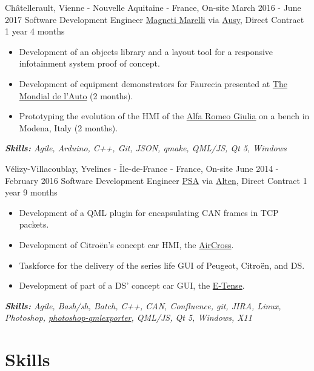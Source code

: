 \documentclass[11pt,a4paper,roman]{moderncv}
\begin{document}
\cventry
{Châtellerault, Vienne - Nouvelle Aquitaine - France, On-site}
{March 2016 - June 2017}
{Software Development Engineer}
{\href{https://www.marelli.com}{Magneti Marelli} via \href{https://www.ausy.com/en}{Ausy}, Direct Contract}
{1 year 4 months}
{}
{
\begin{itemize}
	\item Development of an objects library and a layout tool for a responsive infotainment system proof of concept.
	\item Development of equipment demonstrators for Faurecia presented at \href{https://mondial.paris/en/mondial-de-lauto}{The Mondial de l'Auto} (2 months).
	\item Prototyping the evolution of the HMI of the \href{https://www.alfaromeo.com/giulia}{Alfa Romeo Giulia} on a bench in Modena, Italy (2 months).
\end{itemize}
{\textcolor{color2}{\textit{\textbf{Skills:}
	Agile,
	Arduino,
	C++,
	Git,
	JSON,
	qmake,
	QML/JS,
	Qt 5,
	Windows
	\newline
}}}}


\cventry
{Vélizy-Villacoublay, Yvelines - Île-de-France - France, On-site}
{June 2014 - February 2016}
{Software Development Engineer}
{\href{https://www.groupe-psa.com/en/}{PSA} via \href{https://www.alten.com}{Alten}, Direct Contract}
{1 year 9 months}
{}
{
\begin{itemize}
	\item Development of a QML plugin for encapsulating CAN frames in TCP packets.
	\item Development of Citroën's concept car HMI, the
	\href{https://www.media.stellantis.com/em-en/citroen/press/new-citroen-aircross-concept-car-an-invitation-to-travel-citroen-style}{AirCross}.
\item Taskforce for the delivery of the series life GUI of Peugeot, Citroën, and DS.
\item Development of part of a DS' concept car GUI, the \href{https://www.dsautomobiles.co.uk/ds-experience/concept-cars/ds-e-tense-performance.html}{E-Tense}.
\end{itemize}
{\textcolor{color2}{\textit{\textbf{Skills:}
	Agile,
	Bash/sh,
	Batch,
	C++,
	CAN,
	Confluence,
	git,
	JIRA,
	Linux,
	Photoshop,
	\href{https://github.com/qt-labs/photoshop-qmlexporter}{photoshop-qmlexporter},
	QML/JS,
	Qt 5,
	Windows,
	X11
}}}}

\section{Skills}
\end{document}
